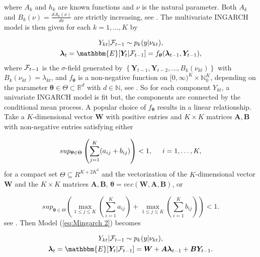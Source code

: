 where $A_k$ and $h_k$ are known functions and $\nu$ is the natural parameter. Both $A_k$ and $B_k(\nu) = \frac{d A_k(\nu)}{d \nu}$ are strictly increasing, see \textcite{Lee:2023}. The multivariate INGARCH model is then given for each $k=1,\ldots,K$ by

\begin{equation}
\begin{gathered}
Y_{kt} | \SigA_{t-1} \sim p_k(y|\nu_{kt}), \\
\bm{\lambda}_t = \mathbbm{E}[\bm{Y}_t | \SigA_{t-1}] = f_{\bm{\theta}}(\bm{\lambda}_{t-1},\bm{Y}_{t-1}),
\label{eq:Mingarch 2}
\end{gathered}
\end{equation}
%
where $\mathcal{F}_{t-1}$ is the $\sigma$-field generated by $\left\{\bm{Y}_{t-1},\bm{Y}_{t-2},\ldots,B_k(\nu_{kt})\right\}$ with $B_k(\nu_{kt})=\lambda_{kt}$, and $f_{\bm{\theta}}$ is a non-negative function on $[0,\infty)^K \times \mathbb{N}_0^K$, depending on the parameter $\bm{\theta} \in \Theta \subset \mathbb{R}^d$ with $d \in \mathbb{N}$, see \textcite{Lee:2023}. So for each component $Y_{kt}$, a univariate INGARCH model is fit but, the components are connected by the conditional mean process. A popular choice of $f_{\bm{\theta}}$ results in a linear relationship. Take a $K$-dimensional vector $\bm{W}$ with positive entries and $K\times K$ matrices $\bm{A},\bm{B}$ with non-negative entries satisfying either

\begin{equation}
sup_{\bm{\theta} \in \Theta} \left(\sum_{j=1}^K(a_{ij}+b_{ij})\right) < 1, \hspace{0.5cm} i=1,\ldots,K , 
\label{eq:Mingarch 2 function condition 1}
\end{equation}
%
for a compact set $\Theta \subseteq R^{K+ 2K^2}$ and the vectorization of the $K$-dimensional vector $\bm{W}$ and the $K\times K$ matrices $\bm{A},\bm{B}$, $\bm{\theta}=vec(\bm{W},\bm{A},\bm{B})$, or 

\begin{equation}
sup_{\bm{\theta} \in \Theta}\left(\max_{1\leq j \leq K}(\sum_{i=1}^K a_{ij}) + \max_{1\leq j \leq K} \left(\sum_{i=1}^K b_{ij}\right)\right) < 1. 
\label{eq:Mingarch 2 function condition 2}
\end{equation}
%
see \textcite{Lee:2023}. Then Model (\ref{eq:Mingarch 2}) becomes 

\begin{equation}
\begin{gathered}
Y_{kt} | \SigA_{t-1} \sim p_k(y|\nu_{kt}), \\
\bm{\lambda}_t = \mathbbm{E}[\bm{Y}_t | \SigA_{t-1}] = \bm{W} + \bm{A}\bm{\lambda}_{t-1} + \bm{B}\bm{Y}_{t-1}. 
\label{eq:Mingarch 2 linear}
\end{gathered}
\end{equation}

